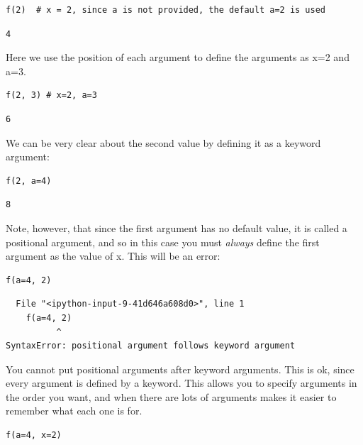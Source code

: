 \documentclass[11pt]{article}
\begin{document}
\begin{verbatim}
f(2)  # x = 2, since a is not provided, the default a=2 is used
\end{verbatim}

\begin{verbatim}
4
\end{verbatim}

Here we use the position of each argument to define the arguments as x=2 and a=3.

\begin{verbatim}
f(2, 3) # x=2, a=3
\end{verbatim}

\begin{verbatim}
6
\end{verbatim}

We can be very clear about the second value by defining it as a keyword argument:

\begin{verbatim}
f(2, a=4)
\end{verbatim}

\begin{verbatim}
8
\end{verbatim}

Note, however, that since the first argument has no default value, it is called a positional argument, and so in this case you must \emph{always} define the first argument as the value of x. This will be an error:

\begin{verbatim}
f(a=4, 2)
\end{verbatim}

\begin{verbatim}
  File "<ipython-input-9-41d646a608d0>", line 1
    f(a=4, 2)
          ^
SyntaxError: positional argument follows keyword argument

\end{verbatim}

You cannot put positional arguments after keyword arguments. This is ok, since every argument is defined by a keyword. This allows you to specify arguments in the order you want, and when there are lots of arguments makes it easier to remember what each one is for.

\begin{verbatim}
f(a=4, x=2)
\end{verbatim}
\end{document}
